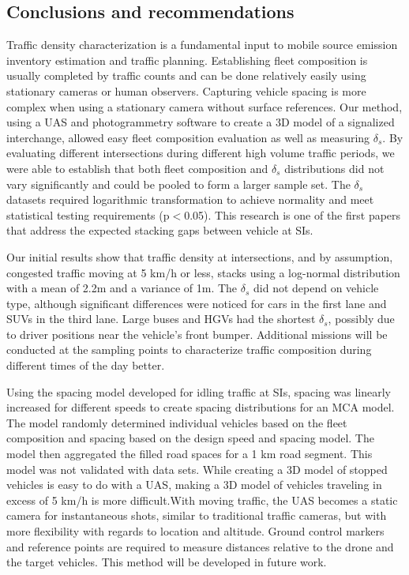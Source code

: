 \documentclass[preprint,12pt,a4paper]{elsarticle}
\begin{document}
\begin{linenumbers}
\section{Conclusions and recommendations}
Traffic density characterization is a fundamental input to mobile source emission inventory estimation and traffic planning. Establishing fleet composition is usually completed by traffic counts and can be done relatively easily using stationary cameras or human observers. Capturing vehicle spacing is more complex when using a stationary camera without surface references. Our method, using a UAS and photogrammetry software to create a 3D model of a signalized interchange, allowed easy fleet composition evaluation as well as measuring $\delta_{s}$. By evaluating different intersections during different high volume traffic periods, we were able to establish that both fleet composition and $\delta_{s}$ distributions did not vary significantly and could be pooled to form a larger sample set. The $\delta_{s}$ datasets required logarithmic transformation to achieve normality and meet statistical testing requirements (p$<$0.05). This research is one of the first papers that address the expected stacking gaps between vehicle at SIs.

Our initial results show that traffic density at intersections, and by assumption, congested traffic moving at 5 km/h or less, stacks using a log-normal distribution with a mean of 2.2m and a variance of 1m. The $\delta_{s}$ did not depend on vehicle type, although significant differences were noticed for cars in the first lane and SUVs in the third lane. Large buses and HGVs had the shortest $\delta_{s}$, possibly due to driver positions near the vehicle's front bumper. Additional missions will be conducted at the sampling points to characterize traffic composition during different times of the day better.

Using the spacing model developed for idling traffic at SIs, spacing was linearly increased for different speeds to create spacing distributions for an MCA model. The model randomly determined individual vehicles based on the fleet composition and spacing based on the design speed and spacing model. The model then aggregated the filled road spaces for a 1 km road segment. This model was not validated with data sets. While creating a 3D model of stopped vehicles is easy to do with a UAS, making a 3D model of vehicles traveling in excess of 5 km/h is more difficult.With moving traffic, the UAS becomes a static camera for instantaneous shots, similar to traditional traffic cameras, but with more flexibility with regards to location and altitude. Ground control markers and reference points are required to measure distances relative to the drone and the target vehicles. This method will be developed in future work.


\end{linenumbers}
\end{document}
